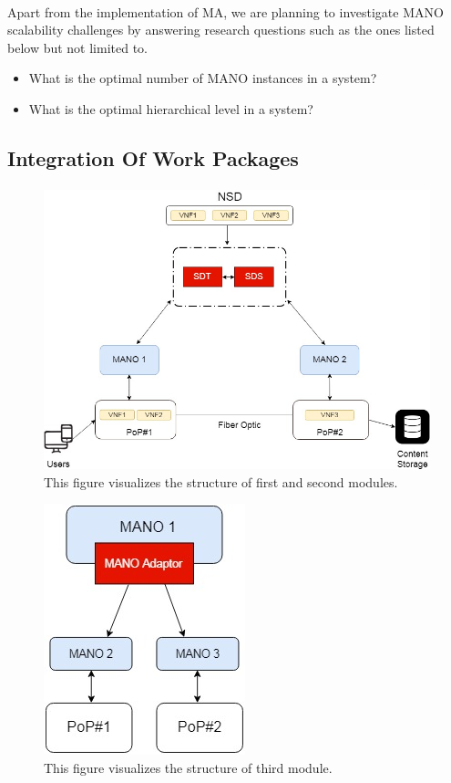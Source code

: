 \paragraph{}
Apart from the implementation of MA, we are planning to investigate MANO scalability challenges by answering research questions such as the ones listed below but not limited to.
\begin{itemize}
	\item What is the optimal number of MANO instances in a system?
	\item What is the optimal hierarchical level in a system?
\end{itemize}


\subsection{Integration Of Work Packages}
\paragraph{}


\begin{figure}[h]
	\centering
	\includegraphics[width=0.7\linewidth]{figures/Structure1}
	\caption{This figure visualizes the structure of first and second modules. }
	\label{fig:structure1}
\end{figure}

\begin{figure}[h]
	\centering
	\includegraphics[width=0.3\linewidth]{figures/Structure2}
	\caption{This figure visualizes the structure of third module. }
	\label{fig:structure2}
\end{figure}


